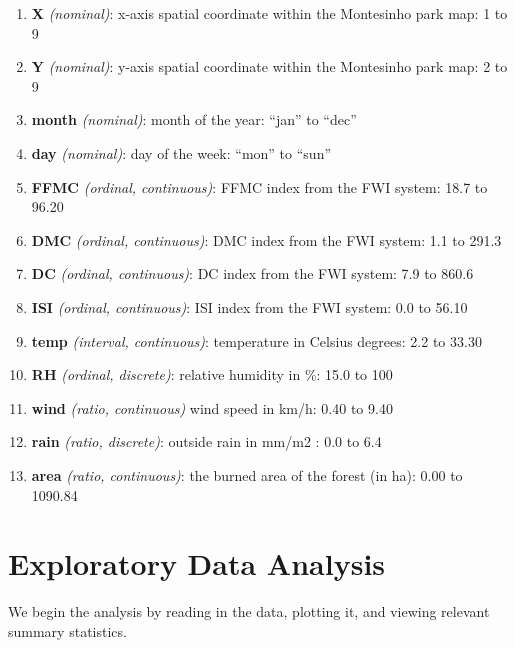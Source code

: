 \documentclass[]{article}
\providecommand{\tightlist}{%
  \setlength{\itemsep}{0pt}\setlength{\parskip}{0pt}}
\begin{document}
\begin{enumerate}
\def\labelenumi{\arabic{enumi}.}
\tightlist
\item
  \textbf{X} \emph{(nominal)}: x-axis spatial coordinate within the
  Montesinho park map: 1 to 9
\item
  \textbf{Y} \emph{(nominal)}: y-axis spatial coordinate within the
  Montesinho park map: 2 to 9
\item
  \textbf{month} \emph{(nominal)}: month of the year: ``jan'' to ``dec''
\item
  \textbf{day} \emph{(nominal)}: day of the week: ``mon'' to ``sun''
\item
  \textbf{FFMC} \emph{(ordinal, continuous)}: FFMC index from the FWI
  system: 18.7 to 96.20
\item
  \textbf{DMC} \emph{(ordinal, continuous)}: DMC index from the FWI
  system: 1.1 to 291.3
\item
  \textbf{DC} \emph{(ordinal, continuous)}: DC index from the FWI
  system: 7.9 to 860.6
\item
  \textbf{ISI} \emph{(ordinal, continuous)}: ISI index from the FWI
  system: 0.0 to 56.10
\item
  \textbf{temp} \emph{(interval, continuous)}: temperature in Celsius
  degrees: 2.2 to 33.30
\item
  \textbf{RH} \emph{(ordinal, discrete)}: relative humidity in \%: 15.0
  to 100
\item
  \textbf{wind} \emph{(ratio, continuous)} wind speed in km/h: 0.40 to
  9.40
\item
  \textbf{rain} \emph{(ratio, discrete)}: outside rain in mm/m2 : 0.0 to
  6.4
\item
  \textbf{area} \emph{(ratio, continuous)}: the burned area of the
  forest (in ha): 0.00 to 1090.84
\end{enumerate}

\section{Exploratory Data Analysis}\label{exploratory-data-analysis}

We begin the analysis by reading in the data, plotting it, and viewing
relevant summary statistics.
\end{document}
